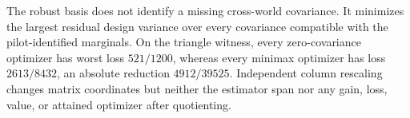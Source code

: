 The robust basis does not identify a missing cross-world covariance.  It minimizes the largest residual design variance over every covariance compatible with the pilot-identified marginals.  On the triangle witness, every zero-covariance optimizer has worst loss \(521/1200\), whereas every minimax optimizer has loss \(2613/8432\), an absolute reduction \(4912/39525\).  Independent column rescaling changes matrix coordinates but neither the estimator span nor any gain, loss, value, or attained optimizer after quotienting.